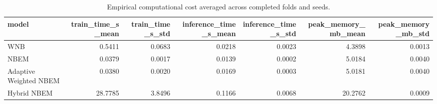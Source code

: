 \begin{table}[!htbp]
\centering
\scriptsize
\caption{Empirical computational cost averaged across completed folds and seeds.}
\label{tab:cost}
\begin{adjustbox}{max width=\textwidth}
\begin{tabular}{lrrrrrr}
\toprule
model & train\_time\_s\_mean & train\_time\_s\_std & inference\_time\_s\_mean & inference\_time\_s\_std & peak\_memory\_mb\_mean & peak\_memory\_mb\_std \\
\midrule
WNB & 0.5411 & 0.0683 & 0.0218 & 0.0023 & 4.3898 & 0.0013 \\
NBEM & 0.0379 & 0.0017 & 0.0139 & 0.0002 & 5.0184 & 0.0040 \\
Adaptive Weighted NBEM & 0.0380 & 0.0020 & 0.0169 & 0.0003 & 5.0181 & 0.0040 \\
Hybrid NBEM & 28.7785 & 3.8496 & 0.1166 & 0.0068 & 20.2762 & 0.0009 \\
\bottomrule
\end{tabular}
\end{adjustbox}
\end{table}
